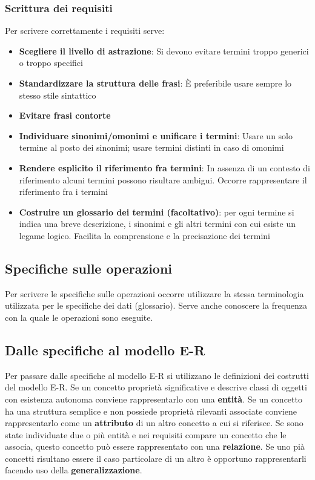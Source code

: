 \documentclass[12pt]{article}
\begin{document}
\subsubsection{Scrittura dei requisiti}
Per scrivere correttamente i requisiti serve:
\begin{itemize}
    \item \textbf{Scegliere il livello di astrazione}: Si devono evitare termini troppo generici o troppo specifici
    \item \textbf{Standardizzare la struttura delle frasi}: È preferibile usare sempre lo stesso stile sintattico
    \item \textbf{Evitare frasi contorte}
    \item \textbf{Individuare sinonimi/omonimi e unificare i termini}: Usare un solo termine al posto dei sinonimi; usare termini distinti in caso di omonimi
    \item \textbf{Rendere esplicito il riferimento fra termini}: In assenza di un contesto di riferimento alcuni termini possono risultare ambigui. Occorre rappresentare il riferimento fra i termini
    \item \textbf{Costruire un glossario dei termini (facoltativo)}: per ogni termine si indica una breve descrizione, i sinonimi e gli altri termini con cui esiste un legame logico. Facilita la comprensione e la precisazione dei termini
\end{itemize}
\subsection{Specifiche sulle operazioni}
Per scrivere le specifiche sulle operazioni occorre utilizzare la stessa terminologia utilizzata per le specifiche dei dati (glossario).
Serve anche conoscere la frequenza con la quale le operazioni sono eseguite.
\subsection{Dalle specifiche al modello E-R}
Per passare dalle specifiche al modello E-R si utilizzano le definizioni dei costrutti del modello E-R.
Se un concetto proprietà significative e descrive classi di oggetti con esistenza autonoma conviene rappresentarlo con una \textbf{entità}.
Se un concetto ha una struttura semplice e non possiede proprietà rilevanti associate conviene rappresentarlo come un \textbf{attributo} di un altro concetto a cui si riferisce.
Se sono state individuate due o più entità e nei requisiti compare un concetto che le associa, questo concetto può essere rappresentato con una \textbf{relazione}.
Se uno pià concetti risultano essere il caso particolare di un altro è opportuno rappresentarli facendo uso della \textbf{generalizzazione}.
\end{document}
